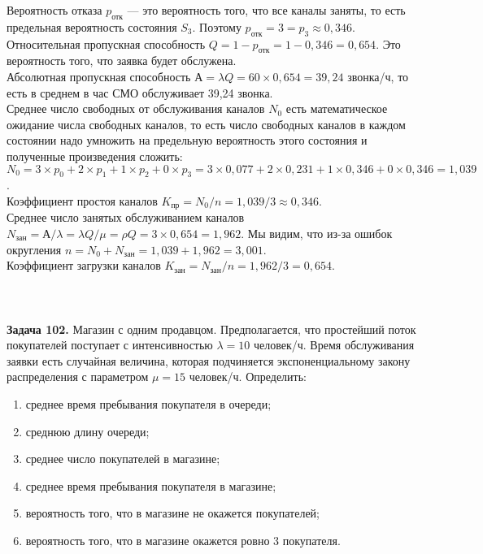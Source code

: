 \documentclass{article}
\begin{document}
Вероятность отказа $p_{\text{отк}}$ — это вероятность того, что все каналы заняты,  то  есть  предельная  вероятность состояния  $S_3$.  Поэтому $p_{\text{отк}} = 3 = p_3 \approx 0,346$. \\ 
\indent
Относительная пропускная способность $Q = 1 - p_{\text{отк}} = 1 - 0,346 = 0,654$. Это вероятность того, что заявка будет обслужена. \\ \indent 
Абсолютная  пропускная способность $А = \lambda Q = 60\times0,654 =  39,24$ звонка/ч, то есть в среднем в час СМО обслуживает 39,24 звонка. \\ \indent 
Среднее число свободных от обслуживания каналов $N_0$ есть математическое ожидание числа свободных  каналов,  то есть число свободных каналов в каждом состоянии  надо умножить на предельную вероятность  этого  состояния  и  полученные  произведения  сложить: $N_0 = 3\times p_0 + 2\times p_1 + 1 \times p_2 + 0 \times p_3 = 3 \times 0,077 + 2 \times 0,231 + 1 \times 0,346 + 0\times 0,346 = 1,039 $. \\ \indent
Коэффициент простоя каналов $K_{\text{пр}} = N_0/n = 1,039/3 \approx 0,346$. \\ \indent
Среднее  число  занятых  обслуживанием  каналов $N_{\text{зан}} = А/\lambda = \lambda Q/\mu = \rho Q = 3\times0,654 = 1,962$. Мы видим, что из-за ошибок округления $n = N_0 + N_{\text{зан}} = 1,039 + 1,962 = 3,001$. \\ \indent 
Коэффициент загрузки каналов $K_{\text{зан}} = N_{\text{зан}}/n = 1,962/3 = 0,654.$
\\ \\ 
\\ \\ 
\textbf{Задача 102.} Магазин с одним продавцом. Предполагается, что простейший поток покупателей поступает с интенсивностью $\lambda = 10$ человек/ч. Время обслуживания заявки есть случайная величина, которая подчиняется экспоненциальному закону распределения с параметром $\mu = 15$ человек/ч. Определить:
\begin{enumerate}
    \item среднее время пребывания покупателя в очереди;
    \item среднюю длину очереди;
    \item среднее число покупателей в магазине;
    \item среднее время пребывания покупателя в магазине;
    \item вероятность того, что в магазине не окажется покупателей;
    \item вероятность того, что в магазине окажется ровно 3 покупателя.
\end{enumerate}
\end{document}
